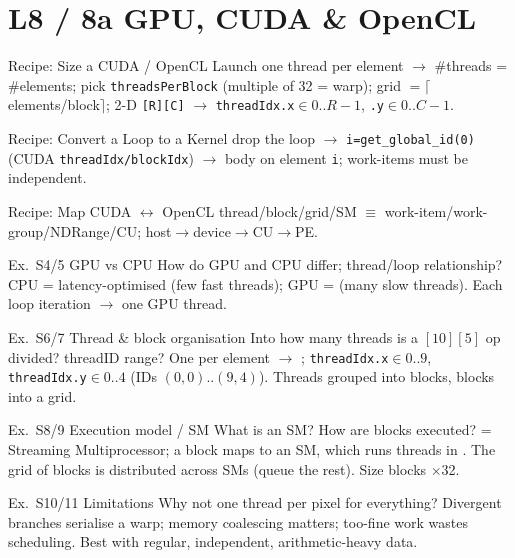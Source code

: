 \section{L8 / 8a GPU, CUDA \& OpenCL}

\begin{KR}{Recipe: Size a CUDA / OpenCL Launch}
    one thread per element $\to$ \#threads = \#elements; pick \texttt{threadsPerBlock} (multiple of 32 = warp); grid $=\lceil$elements/block$\rceil$; 2-D \texttt{[R][C]} $\to$ \texttt{threadIdx.x}$\in0..R{-}1$, \texttt{.y}$\in0..C{-}1$.
\end{KR}

\begin{KR}{Recipe: Convert a Loop to a Kernel}
    drop the loop $\to$ \texttt{i=get\_global\_id(0)} (CUDA \texttt{threadIdx/blockIdx}) $\to$ body on element \texttt{i}; work-items must be independent.
\end{KR}

\begin{KR}{Recipe: Map CUDA $\leftrightarrow$ OpenCL}
    thread/block/grid/SM $\equiv$ work-item/work-group/NDRange/CU; host$\to$device$\to$CU$\to$PE.
\end{KR}

\begin{example2}{Ex.\ S4/5 GPU vs CPU}
    How do GPU and CPU differ; thread/loop relationship?
    \tcblower
    CPU = latency-optimised (few fast threads); GPU =  (many slow threads). Each loop iteration $\to$ one GPU thread.
\end{example2}

\begin{example2}{Ex.\ S6/7 Thread \& block organisation}
    Into how many threads is a $[10][5]$ op divided? threadID range?
    \tcblower
    One per element $\to$ ; \texttt{threadIdx.x}$\in0..9$, \texttt{threadIdx.y}$\in0..4$ (IDs $(0,0)..(9,4)$). Threads grouped into blocks, blocks into a grid.
\end{example2}

\begin{example2}{Ex.\ S8/9 Execution model / SM}
    What is an SM? How are blocks executed?
    \tcblower
     = Streaming Multiprocessor; a block maps to an SM, which runs threads in . The grid of blocks is distributed across SMs (queue the rest). Size blocks $\times$32.
\end{example2}

\begin{example2}{Ex.\ S10/11 Limitations}
    Why not one thread per pixel for everything?
    \tcblower
    Divergent branches serialise a warp; memory coalescing matters; too-fine work wastes scheduling. Best with regular, independent, arithmetic-heavy data.
\end{example2}

